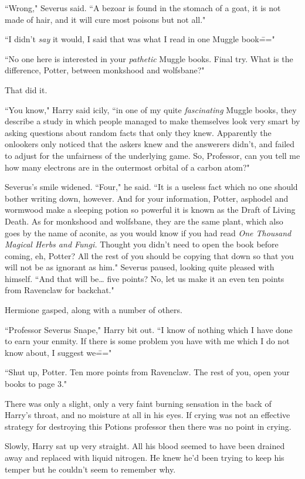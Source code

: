 ``Wrong," Severus said. ``A bezoar is found in the stomach of a goat, it is not made of hair, and it will cure most poisons but not all."

``I didn't \emph{say} it would, I said that was what I read in one Muggle book\==="

``No one here is interested in your \emph{pathetic} Muggle books. Final try. What is the difference, Potter, between monkshood and wolfsbane?"

That did it.

``You know," Harry said icily, ``in one of my quite \emph{fascinating} Muggle books, they describe a study in which people managed to make themselves look very smart by asking questions about random facts that only they knew. Apparently the onlookers only noticed that the askers knew and the answerers didn't, and failed to adjust for the unfairness of the underlying game. So, Professor, can you tell me how many electrons are in the outermost orbital of a carbon atom?"

Severus's smile widened. ``Four," he said. ``It is a useless fact which no one should bother writing down, however. And for your information, Potter, asphodel and wormwood make a sleeping potion so powerful it is known as the Draft of Living Death. As for monkshood and wolfsbane, they are the same plant, which also goes by the name of aconite, as you would know if you had read \emph{One Thousand Magical Herbs and Fungi.} Thought you didn't need to open the book before coming, eh, Potter? All the rest of you should be copying that down so that you will not be as ignorant as him." Severus paused, looking quite pleased with himself. ``And that will be{\ldots} five points? No, let us make it an even ten points from Ravenclaw for backchat."

Hermione gasped, along with a number of others.

``Professor Severus Snape," Harry bit out. ``I know of nothing which I have done to earn your enmity. If there is some problem you have with me which I do not know about, I suggest we\==="

``Shut up, Potter. Ten more points from Ravenclaw. The rest of you, open your books to page 3."

There was only a slight, only a very faint burning sensation in the back of Harry's throat, and no moisture at all in his eyes. If crying was not an effective strategy for destroying this Potions professor then there was no point in crying.

Slowly, Harry sat up very straight. All his blood seemed to have been drained away and replaced with liquid nitrogen. He knew he'd been trying to keep his temper but he couldn't seem to remember why.

